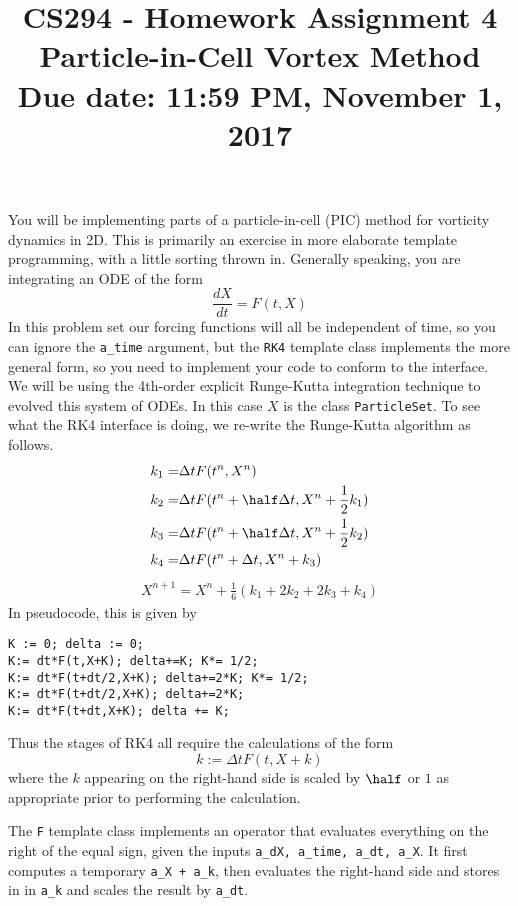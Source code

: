 \documentclass[11pt]{article}
\title{CS294  - Homework Assignment 4 \\ Particle-in-Cell Vortex Method \\
Due date: 11:59 PM, November 1, 2017}
\begin{document}
\maketitle

\noindent

You will be implementing parts of a particle-in-cell (PIC) method for vorticity dynamics in 2D. This is primarily an exercise in more elaborate template programming, with a little sorting thrown in. Generally speaking, you are integrating an  ODE of the form
\begin{equation}
\frac{dX}{dt} = F(t, X)
\end{equation}
In this problem set our forcing functions will all be independent of time, so you can ignore the {\tt a\_time} argument, but the {\tt RK4} template class implements the more general form, so you need to implement your code to conform to the interface.
We will be using the 4th-order explicit Runge-Kutta integration technique to evolved this system of ODEs. In this case $X$ is the class {\tt ParticleSet}. 
To see what the RK4 interface is doing, we re-write the Runge-Kutta algorithm as follows.
\begin{align*}
k_1 = & {\Delta t} F(t^n,X^n) \\
k_2 = & {\Delta t} F(t^n + \half \Delta t, X^n + \frac{1}{2} k_1) \\
k_3 = & {\Delta t} F(t^n + \half \Delta t, X^n + \frac{1}{2} k_2) \\
k_4 = & {\Delta t} F(t^n + \Delta t, X^n + k_3) 
\end{align*}
\begin{align*}
X^{n+1} = X^{n} + \frac{1}{6} (k_1 + 2k_2 + 2k_3 + k_4)
\end{align*}
In pseudocode, this is given by
\begin{verbatim}
K := 0; delta := 0;
K:= dt*F(t,X+K); delta+=K; K*= 1/2;
K:= dt*F(t+dt/2,X+K); delta+=2*K; K*= 1/2;
K:= dt*F(t+dt/2,X+K); delta+=2*K;
K:= dt*F(t+dt,X+K); delta += K;
\end{verbatim}

Thus the stages of RK4 all require the calculations of the form
\begin{equation}
k := \Delta t F(t, X+k)
\end{equation}
where the $k$ appearing on the right-hand side is scaled by $\half$ or $1$ as appropriate prior to performing the calculation. 

The {\tt F} template class implements an operator that evaluates everything on the right of the equal sign, given the inputs {\tt a\_dX, a\_time, a\_dt, a\_X}. It first computes a temporary {\tt a\_X + a\_k}, then evaluates the right-hand side and stores in in {\tt a\_k} and scales the result by {\tt a\_dt}. 
\end{document}
